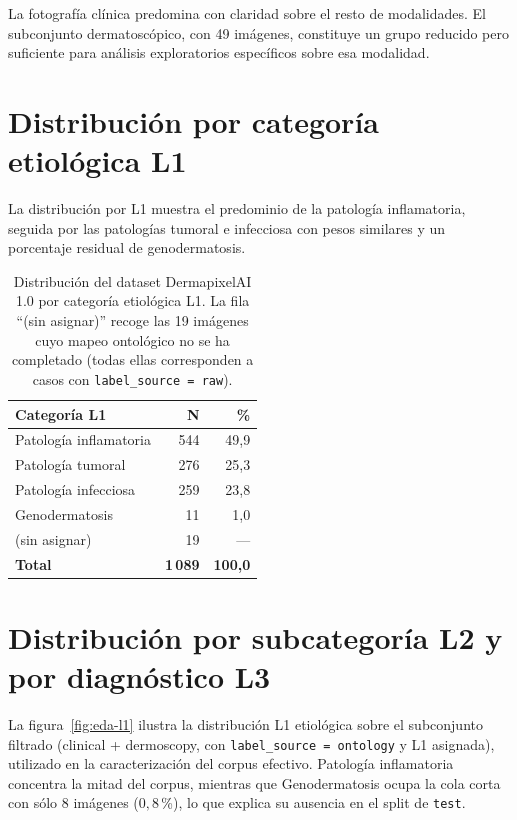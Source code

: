 La fotografía clínica predomina con claridad sobre el resto de
modalidades. El subconjunto dermatoscópico, con 49 imágenes,
constituye un grupo reducido pero suficiente para análisis
exploratorios específicos sobre esa modalidad.

\section{Distribución por categoría etiológica L1}
\label{sec:anexo-l1}

La distribución por L1 muestra el predominio de la patología
inflamatoria, seguida por las patologías tumoral e infecciosa con
pesos similares y un porcentaje residual de genodermatosis.

\begin{table}[H]
\centering
\small
\caption{Distribución del dataset DermapixelAI 1.0 por categoría
etiológica L1. La fila ``(sin asignar)'' recoge las 19 imágenes cuyo
mapeo ontológico no se ha completado (todas ellas corresponden a
casos con \texttt{label\_source = raw}).}
\label{tab:anexo-l1}
\begin{tabular}{lrr}
\hline
Categoría L1               & N       & \%      \\
\hline
Patología inflamatoria     & 544     & 49,9    \\
Patología tumoral          & 276     & 25,3    \\
Patología infecciosa       & 259     & 23,8    \\
Genodermatosis             & 11      & 1,0     \\
(sin asignar)              & 19      & ---     \\
\hline
\textbf{Total}             & \textbf{1\,089} & \textbf{100,0} \\
\hline
\end{tabular}
\end{table}

\section{Distribución por subcategoría L2 y por diagnóstico L3}
\label{sec:anexo-l2-l3}

La figura~\ref{fig:eda-l1} ilustra la distribución L1 etiológica
sobre el subconjunto filtrado (clinical + dermoscopy, con
\texttt{label\_source = ontology} y L1 asignada), utilizado en la
caracterización del corpus efectivo. Patología inflamatoria
concentra la mitad del corpus, mientras que Genodermatosis ocupa la
cola corta con sólo $8$ imágenes ($0{,}8$\,\%), lo que explica su
ausencia en el split de \texttt{test}.

